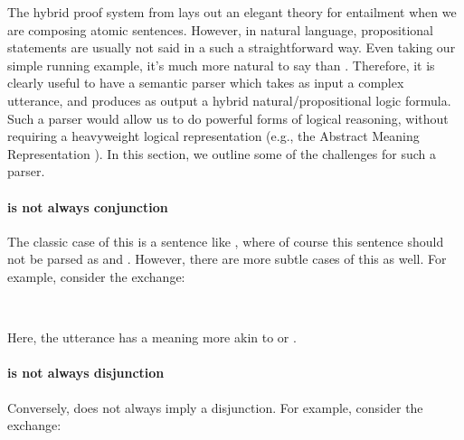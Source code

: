 %
%
%
The hybrid proof system from  lays out an elegant theory
  for entailment when we are composing atomic sentences.
However, in natural language, propositional statements are usually not said in a such a straightforward
  way.
Even taking our simple running example, it's much more natural to say
   than .
Therefore, it is clearly useful to have a semantic parser which takes as input a complex
  utterance, and produces as output a hybrid natural/propositional logic formula.
Such a parser would allow us to do powerful forms of logical reasoning, without requiring
  a heavyweight logical representation (e.g., the Abstract Meaning Representation 
  \cite{key:2013banarescu-amr}).
In this section, we outline some of the challenges for such a parser.


\paragraph{ is not always conjunction}
The classic case of this is a sentence like , where of course
  this sentence should not be parsed as  and .
However, there are more subtle cases of this as well.
For example, consider the exchange:

\begin{displayquote}
 \\
\end{displayquote}

Here, the utterance  has a meaning more akin to
   or .


\paragraph{ is not always disjunction}
Conversely,  does not always imply a disjunction.
For example, consider the exchange:

\begin{displayquote}
 \\
\end{displayquote}

